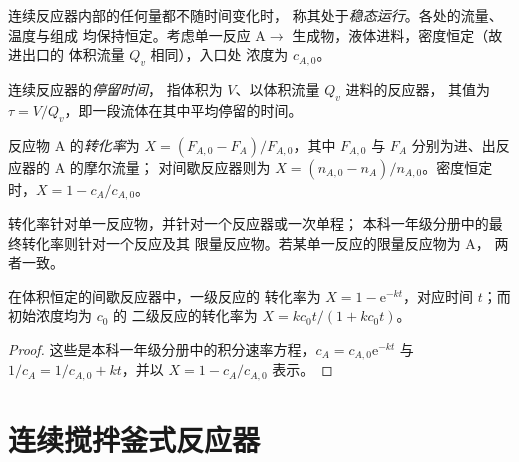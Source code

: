 连续反应器内部的任何量都不随时间变化时，
称其处于\emph{稳态运行}。各处的流量、温度与组成
均保持恒定。考虑单一反应
$\mathrm A \to$ 生成物，液体进料，密度恒定（故进出口的
体积流量 $Q_v$ 相同），入口处
浓度为 $c_{A,0}$。

\begin{definition}[停留时间]\label{def:b2:continuous-reactors:residence-time}
连续反应器的\emph{停留时间}，
指体积为 $V$、以体积流量 $Q_v$ 进料的反应器，
其值为 $\tau = V/Q_v$，即一段流体在其中平均停留的时间。
\end{definition}

\begin{definition}[转化率]\label{def:b2:continuous-reactors:conversion}
反应物 A 的\emph{转化率}为 $X = (F_{A,0} -
F_A)/F_{A,0}$，其中 $F_{A,0}$ 与 $F_A$ 分别为进、出反应器的 A 的摩尔流量；
对间歇反应器则为 $X = (n_{A,0} -
n_A)/n_{A,0}$。密度恒定时，$X = 1 - c_A/c_{A,0}$。
\end{definition}

转化率针对单一反应物，并针对一个反应器或一次单程；
本科一年级分册中的最终转化率则针对一个反应及其
限量反应物。若某单一反应的限量反应物为 A，
两者一致。

\begin{proposition}[间歇反应器]\label{prop:b2:continuous-reactors:batch}
在体积恒定的间歇反应器中，一级反应的
转化率为 $X = 1 - \mathrm e^{-kt}$，对应时间 $t$；而初始浓度均为 $c_0$ 的
二级反应的转化率为 $X =
kc_0t/(1 + kc_0t)$。
\end{proposition}

\begin{proof}
这些是本科一年级分册中的积分速率方程，$c_A = c_{A,0}
\mathrm e^{-kt}$ 与 $1/c_A = 1/c_{A,0} + kt$，并以 $X = 1 -
c_A/c_{A,0}$ 表示。
\end{proof}

\section{连续搅拌釜式反应器}

